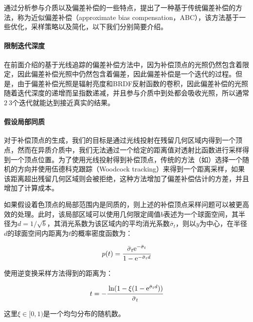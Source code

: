 通过分析参与介质以及偏差补偿的一些特点，\cite{a:ApproximateBiasCompensationforRenderingSceneswithHeterogeneousParticipatingMedia}提出了一种基于传统偏差补偿的方法，称为近似偏差补偿（approximate bias compensation，ABC），该方法基于一些优化，采样策略以及简化，以下我们分别简要介绍。



\paragraph{限制迭代深度}
在前面介绍的基于光线追踪的偏差补偿方法中，因为补偿顶点的光照仍然包含着限定，因此偏差补偿光照中仍然包含着偏差，因此偏差补偿是一个迭代的过程。但是，由于偏差补偿光照是辐射亮度和BRDF反射函数的卷积，因此偏差补偿的光照随着迭代深度的递增而呈指数递减，并且参与介质中到处都会吸收光照，所以通常$2~3$个迭代就能达到接近真实的结果。



\paragraph{假设局部同质}
对于补偿顶点的生成，我们的目标是通过光线投射在残留几何区域内得到一个顶点，然而在异质介质中，我们无法通过一个给定的距离值对透射比函数进行采样得到一个顶点位置。为了使用光线投射得到补偿顶点，传统的方法（如\cite{a:UnbiasedGlobalIlluminationwithParticipatingMedia}）选择一个随机的方向并使用伍德科克跟踪（Woodcock tracking）来得到一个距离采样，如果该距离超出残留几何区域则会被拒绝，这种方法增加了偏差补偿估计的方差，并且增加了计算成本。

如果假设着色顶点的局部范围内是同质的，则上述的补偿顶点采样问题可以被更高效的处理。此时，该局部区域可以使用几何限定阈值$b$表述为一个球面空间，其半径为$d=1/\sqrt{{b}}$，其消光系数为该区域内的平均消光系数$\bar{\sigma}_t$，则以$y$为中心，在半径$d$的球面空间内距离为$t$的概率密度函数为：

\begin{equation}
	p(t)= \cfrac{\bar{\sigma}_t {\rm e}^{-\bar{\sigma}_t}}{1-{\rm e}^{-\bar{\sigma}_t d}}
\end{equation}

\noindent 使用逆变换采样方法得到的距离为：

\begin{equation}
	t=- \cfrac{\ln(1-\xi(1-{\rm e}^{\bar{\sigma}_td}))}{\bar{\sigma}_t}
\end{equation}

\noindent 这里$\xi\in[0,1)$是一个均匀分布的随机数。

